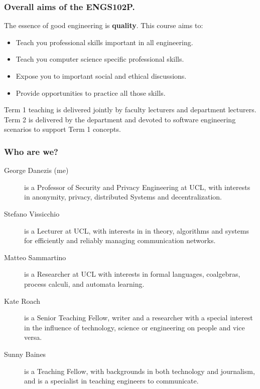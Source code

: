 \documentclass{beamer} %
\newcommand\emc[1]{\textcolor{brightblue}{\textbf{#1}}}
\begin{document}
\begin{frame}
\frametitle{Overall aims of the ENGS102P.} 

The essence of good engineering is \emc{quality}. This course aims to:

\begin{itemize}
	\item Teach you professional skills important in all engineering.
	\item Teach you computer science specific professional skills.
	\item Expose you to important social and ethical discussions.
	\item Provide opportunities to practice all those skills.
\end{itemize}

\vspace{3mm}
Term 1 teaching is delivered jointly by faculty lecturers and department lecturers. Term 2 is delivered by the department and devoted to software engineering scenarios to support Term 1 concepts.

\end{frame}

\begin{frame}
\frametitle{Who are we?} 

\begin{description}
\item[George Danezis (me)] is a Professor of Security and Privacy Engineering at UCL, with interests in anonymity, privacy, distributed Systems and decentralization.
\item[Stefano Vissicchio] is a Lecturer at UCL, with interests in in theory, algorithms and systems for efficiently and reliably managing communication networks.
\item[Matteo Sammartino] is a Researcher at UCL with interests in formal languages, coalgebras, process calculi, and automata learning.
\item[Kate Roach] is a Senior Teaching Fellow, writer and a researcher with a special interest in the influence of technology, science or engineering on people and vice versa.
\item[Sunny Baines] is a Teaching Fellow, with backgrounds in both technology and journalism, and is a specialist in teaching engineers to communicate.
\end{description}

\end{frame}
\end{document}
